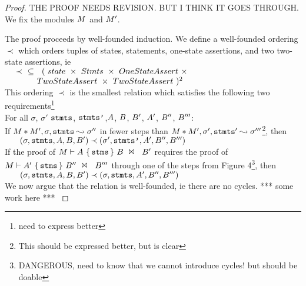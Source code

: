 \begin{proof} THE PROOF NEEDS REVISION. BUT I THINK IT GOES THROUGH.
We fix the modules $M$ and $M'$.

{The proof proceeds by well-founded induction.
We define a well-founded ordering $\prec$ which orders tuples of states, statements, one-state assertions, and two two-state assertions, ie\\
$\mbox{ } \ \ \prec\ \  \subseteq\  \ (\ state\ \times\ \syntax{Stmts}\ \times\ \syntax{OneStateAssert}\ \times$
\\
$  \mbox{ } \hspace{.49in}  \syntax{TwoStateAssert}\  \times\ \syntax{TwoStateAssert} \ )^2
$
\\
This ordering $\prec$ is the
 smallest relation which satisfies the following two requirements\footnote{need to express better}
\\
For all $\sigma$, $\sigma'$ ${\textrm{\ttfamily{stmts}}}$, ${\textrm{\ttfamily{stmts'}}}$,$A$, $B$, $B'$,  $A'$, $B''$, $B'''$:
\\
If $M*M', \sigma, {\textrm{\ttfamily{stmts}}} \leadsto \sigma''$ in fewer steps than $M*M', \sigma', {\textrm{\ttfamily{stmts}}}' \leadsto \sigma'''$\footnote{This should be expressed better, but is clear}, then \\
$  \mbox{ } \hspace{.2in} (\sigma, {\textrm{\ttfamily{stmts}}}, A, B, B') \prec (\sigma', {\textrm{\ttfamily{stmts'}}}, A', B'', B''')$
\\
If the proof of ${{M}\vdash {\ensuremath {A}}\ \{\, {{\textrm{\ttfamily{stms}}}}\, \}\ {B}\ \Join\ \ {B'} }$ requires the proof of
${{M}\vdash {\ensuremath {A}'}\ \{\, {{\textrm{\ttfamily{stms}}}}\, \}\ {B''}\ \Join\ \ {B'''} }$ through one of the steps from Figure 4\footnote{DANGEROUS, need to know that we cannot introduce cycles! but should be doable}, then\\
 $  \mbox{ } \hspace{.2in}  (\sigma, {\textrm{\ttfamily{stmts}}}, A, B, B') \prec (\sigma, {\textrm{\ttfamily{stmts}}}, A', B'', B''')$
\\
We now argue that the relation is well-founded, ie there are no cycles. *** some work here ***
}




\end{proof}
